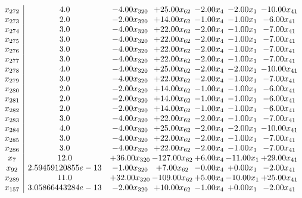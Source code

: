 \documentclass[8pt]{article}
\begin{document}
\[\begin{array}{c| c c@{\hskip 2pt} c@{\hskip 2pt} c@{\hskip 2pt} c@{\hskip 2pt} c@{\hskip 2pt} }
 x_{272}   &  4.0 & -4.00 x_{320} & + 25.00 x_{62} & -2.00 x_{4} & -2.00 x_{1} & -10.00 x_{41}\\
 x_{273}   &  2.0 & -2.00 x_{320} & + 14.00 x_{62} & -1.00 x_{4} & -1.00 x_{1} & -6.00 x_{41}\\
 x_{274}   &  3.0 & -4.00 x_{320} & + 22.00 x_{62} & -2.00 x_{4} & -1.00 x_{1} & -7.00 x_{41}\\
 x_{275}   &  3.0 & -4.00 x_{320} & + 22.00 x_{62} & -2.00 x_{4} & -1.00 x_{1} & -7.00 x_{41}\\
 x_{276}   &  3.0 & -4.00 x_{320} & + 22.00 x_{62} & -2.00 x_{4} & -1.00 x_{1} & -7.00 x_{41}\\
 x_{277}   &  3.0 & -4.00 x_{320} & + 22.00 x_{62} & -2.00 x_{4} & -1.00 x_{1} & -7.00 x_{41}\\
 x_{278}   &  4.0 & -4.00 x_{320} & + 25.00 x_{62} & -2.00 x_{4} & -2.00 x_{1} & -10.00 x_{41}\\
 x_{279}   &  3.0 & -4.00 x_{320} & + 22.00 x_{62} & -2.00 x_{4} & -1.00 x_{1} & -7.00 x_{41}\\
 x_{280}   &  2.0 & -2.00 x_{320} & + 14.00 x_{62} & -1.00 x_{4} & -1.00 x_{1} & -6.00 x_{41}\\
 x_{281}   &  2.0 & -2.00 x_{320} & + 14.00 x_{62} & -1.00 x_{4} & -1.00 x_{1} & -6.00 x_{41}\\
 x_{282}   &  2.0 & -2.00 x_{320} & + 14.00 x_{62} & -1.00 x_{4} & -1.00 x_{1} & -6.00 x_{41}\\
 x_{283}   &  3.0 & -4.00 x_{320} & + 22.00 x_{62} & -2.00 x_{4} & -1.00 x_{1} & -7.00 x_{41}\\
 x_{284}   &  4.0 & -4.00 x_{320} & + 25.00 x_{62} & -2.00 x_{4} & -2.00 x_{1} & -10.00 x_{41}\\
 x_{285}   &  3.0 & -4.00 x_{320} & + 22.00 x_{62} & -2.00 x_{4} & -1.00 x_{1} & -7.00 x_{41}\\
 x_{286}   &  3.0 & -4.00 x_{320} & + 22.00 x_{62} & -2.00 x_{4} & -1.00 x_{1} & -7.00 x_{41}\\
 x_{7}   &  12.0 & + 36.00 x_{320} & -127.00 x_{62} & +  6.00 x_{4} & -11.00 x_{1} & + 29.00 x_{41}\\
 x_{92}   &  2.59459120855e-13 & -1.00 x_{320} & +  7.00 x_{62} & -0.00 x_{4} & +  0.00 x_{1} & -2.00 x_{41}\\
 x_{289}   &  11.0 & + 32.00 x_{320} & -109.00 x_{62} & +  5.00 x_{4} & -10.00 x_{1} & + 25.00 x_{41}\\
 x_{157}   &  3.05866443284e-13 & -2.00 x_{320} & + 10.00 x_{62} & -1.00 x_{4} & +  0.00 x_{1} & -2.00 x_{41}\\

\end{array}\]
\end{document}
